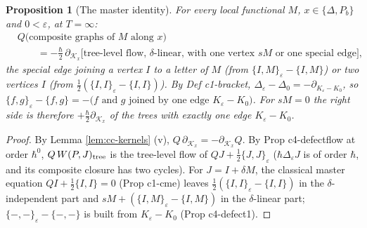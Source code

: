 \documentclass[11pt]{article}
\numberwithin{equation}{section}
\theoremstyle{plain}
\newtheorem{proposition}[theorem]{Proposition}
\theoremstyle{definition}
\begin{document}
\begin{proposition}[The master identity]
\label{prop:cc-master}
For every local functional $M$, $x\in\{\Delta,P_b\}$ and $0<\varepsilon$, at $T=\infty$:
\[
\begin{aligned}
&Q\big(\text{composite graphs of }M\text{ along }x\big)\\
&\qquad=-\tfrac\hbar2\,\partial_{\mathcal K_x}\Big[\text{tree-level flow, }\delta\text{-linear, with one vertex }sM\text{ or one special edge}\Big],
\end{aligned}
\]
the special edge joining a vertex $I$ to a letter of $M$ (from $\{I,M\}_\varepsilon-\{I,M\}$) or two vertices $I$ (from $\tfrac12(\{I,I\}_\varepsilon-\{I,I\})$). By Def c1-bracket, $\Delta_\varepsilon-\Delta_0=-\partial_{K_\varepsilon-K_0}$, so $\{f,g\}_\varepsilon-\{f,g\}=-\big(f\text{ and }g\text{ joined by one edge }K_\varepsilon-K_0\big)$. For $sM=0$ the right side is therefore $+\tfrac\hbar2\partial_{\mathcal K_x}$ of the trees with exactly one edge $K_\varepsilon-K_0$.
\end{proposition}

\begin{proof}
By Lemma \ref{lem:cc-kernels} (v), $Q\,\partial_{\mathcal K_x}=-\partial_{\mathcal K_x}Q$. By Prop c4-defectflow at order $\hbar^0$, $Q\,W(P,J)_{\rm tree}$ is the tree-level flow of $QJ+\tfrac12\{J,J\}_\varepsilon$ ($\hbar\Delta_\varepsilon J$ is of order $\hbar$, and its composite closure has two cycles). For $J=I+\delta M$, the classical master equation $QI+\tfrac12\{I,I\}=0$ (Prop c1-cme) leaves $\tfrac12(\{I,I\}_\varepsilon-\{I,I\})$ in the $\delta$-independent part and $sM+(\{I,M\}_\varepsilon-\{I,M\})$ in the $\delta$-linear part; $\{-,-\}_\varepsilon-\{-,-\}$ is built from $K_\varepsilon-K_0$ (Prop c4-defect1).
\end{proof}
\end{document}

